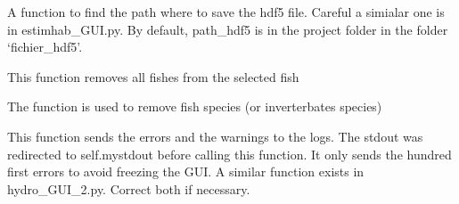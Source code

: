 \documentclass[letterpaper,10pt,english]{sphinxmanual}
\begin{document}
\begin{fulllineitems}
\begin{fulllineitems}
\begin{quote}
\begin{description}
\end{description}\end{quote}

\end{fulllineitems}


\begin{fulllineitems}
\label{\detokenize{index:src_GUI.estimhab_GUI.StatModUseful.find_path_text_est}}
A function to find the path where to save the hdf5 file. Careful a simialar one is in estimhab\_GUI.py. By default,
path\_hdf5 is in the project folder in the folder `fichier\_hdf5'.

\end{fulllineitems}


\begin{fulllineitems}
\label{\detokenize{index:src_GUI.estimhab_GUI.StatModUseful.remove_all_fish}}
This function removes all fishes from the selected fish

\end{fulllineitems}


\begin{fulllineitems}
\label{\detokenize{index:src_GUI.estimhab_GUI.StatModUseful.remove_fish}}
The function is used to remove fish species (or inverterbates species)

\end{fulllineitems}


\begin{fulllineitems}
\label{\detokenize{index:src_GUI.estimhab_GUI.StatModUseful.send_err_log}}
This function sends the errors and the warnings to the logs.
The stdout was redirected to self.mystdout before calling this function. It only sends the hundred first errors
to avoid freezing the GUI. A similar function exists in hydro\_GUI\_2.py. Correct both if necessary.


\end{fulllineitems}
\end{fulllineitems}
\end{document}
